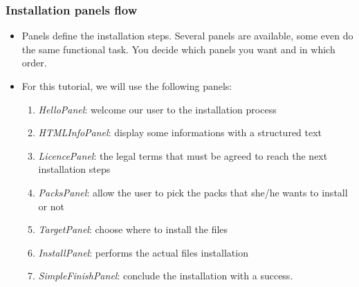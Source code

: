 \documentclass[compress,10pt]{beamer}
\begin{document}
\begin{frame}

\frametitle{Installation panels flow}

\begin{itemize}

  \item Panels define the installation steps. Several panels are available, some
  even do the same functional task.
  \alert{You decide which panels you want and in which order.}

  \item For this tutorial, we will use the following panels:
    \begin{enumerate}

      \item \textsl{HelloPanel}: welcome our user to the installation process

      \item \textsl{HTMLInfoPanel}: display some informations with a structured
      text

      \item \textsl{LicencePanel}: the legal terms that must be agreed to reach
      the next installation steps

      \item \textsl{PacksPanel}: allow the user to pick the packs that she/he wants
      to install or not

      \item \textsl{TargetPanel}: choose where to install the files

      \item \textsl{InstallPanel}: performs the actual files installation

      \item \textsl{SimpleFinishPanel}: conclude the installation with a success.

    \end{enumerate}

\end{itemize}

\end{frame}

\end{document}
